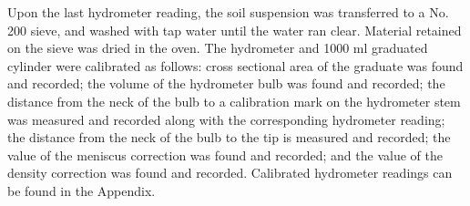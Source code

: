 \documentclass{article}
\begin{document}
\par Upon the last hydrometer reading, the soil suspension was transferred to a No. 200 sieve, and washed with tap water until the water ran clear. Material retained on the sieve was dried in the oven. The hydrometer and 1000 ml graduated cylinder were calibrated as follows: cross sectional area of the graduate was found and recorded; the volume of the hydrometer bulb was found and recorded; the distance from the neck of the bulb to a calibration mark on the hydrometer stem was measured and recorded along with the corresponding hydrometer reading; the distance from the neck of the bulb to the tip is measured and recorded; the value of the meniscus correction was found and recorded; and the value of the density correction was found and recorded. Calibrated hydrometer readings can be found in the Appendix.  
\newpage  
\end{document}
